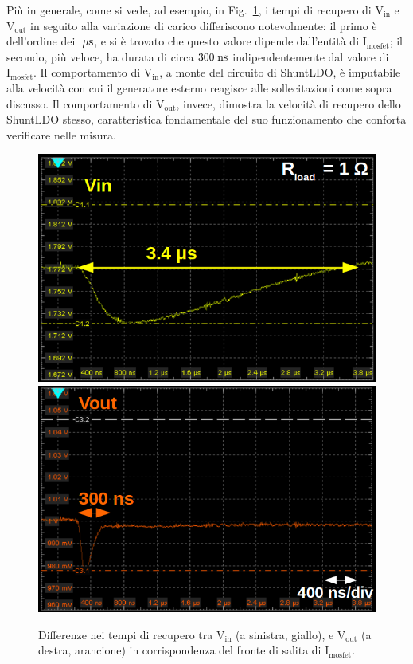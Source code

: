 Pi\`u in generale, come si vede, ad esempio, in Fig.~\ref{DipVoutVin}, i tempi di recupero di $\mathrm{V_{in}}$ e $\mathrm{V_{out}}$ in seguito alla variazione di carico differiscono notevolmente: il primo è dell'ordine dei $\; \mu \rm s$, e si \`e trovato che questo valore dipende dall'entit\`a di $\mathrm{I_{mosfet}}$; il secondo, più veloce, ha durata di circa $300\rm \; ns$ indipendentemente dal valore di $\mathrm{I_{mosfet}}$. Il comportamento di $\mathrm{V_{in}}$, a monte del circuito di ShuntLDO, è imputabile alla velocità con cui il generatore esterno reagisce alle sollecitazioni come sopra discusso. Il comportamento di $\mathrm{V_{out}}$, invece, dimostra la velocità di recupero dello ShuntLDO stesso, caratteristica fondamentale del suo funzionamento che conforta verificare nelle misura.
\begin{figure}
  \includegraphics[width=.48\linewidth]{Immagini/zoomDipendenzaVoutdaVin1}
  \hfill
  \includegraphics[width=.48\linewidth]{Immagini/zoomDipendenzaVoutdaVin2}
\caption{Differenze nei tempi di recupero tra $\mathrm{V_{in}}$ (a sinistra, giallo), e $\mathrm{V_{out}}$ (a destra, arancione) in corrispondenza del fronte di salita  di $\mathrm{I_{mosfet}}$.}
\label{DipVoutVin}
\end{figure}



